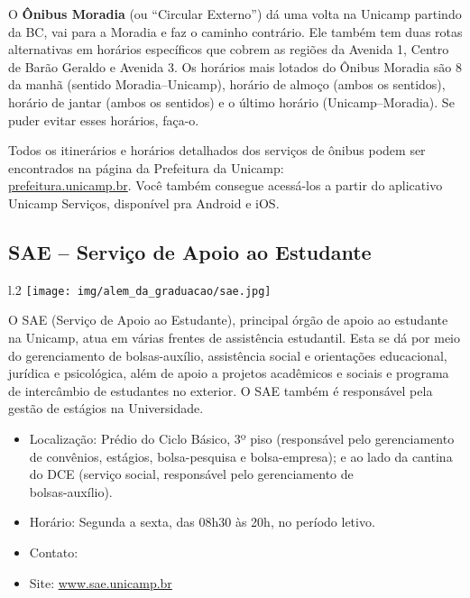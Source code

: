 O \textbf{Ônibus Moradia} (ou ``Circular Externo'') dá uma volta na Unicamp
partindo da BC, vai para a Moradia e faz o caminho contrário. Ele também tem
duas rotas alternativas em horários específicos que cobrem as regiões da Avenida
1, Centro de Barão Geraldo e Avenida 3. Os horários mais lotados do Ônibus
Moradia são 8 da manhã (sentido Moradia--Unicamp), horário de almoço (ambos os
sentidos), horário de jantar (ambos os sentidos) e o último horário
(Unicamp--Moradia). Se puder evitar esses horários, faça-o.

Todos os itinerários e horários detalhados dos serviços de ônibus podem ser
encontrados na página da Prefeitura da Unicamp: \\\url{prefeitura.unicamp.br}.
Você também consegue acessá-los a partir do aplicativo Unicamp Serviços,
disponível pra Android e iOS.

\subsection{SAE -- Serviço de Apoio ao Estudante}
\begin{wrapfigure}{l}{.2\textwidth}
    \centering
    \texttt{[image: img/alem\_da\_graduacao/sae.jpg]}
\end{wrapfigure}
O SAE (Serviço de Apoio ao Estudante), principal órgão de apoio ao estudante na
Unicamp, atua em várias frentes de assistência estudantil. Esta se dá por meio do
gerenciamento de bolsas-auxílio, assistência social e orientações educacional,
jurídica e psicológica, além de apoio a projetos acadêmicos e sociais e programa
de intercâmbio de estudantes no exterior. O SAE também é responsável pela gestão
de estágios na Universidade.

\begin{itemize}
    \item  Localização: Prédio do Ciclo Básico, 3º piso (responsável pelo
        gerenciamento de convênios, estágios, bolsa-pesquisa e bolsa-empresa); e
        ao lado da cantina do DCE (serviço social, responsável pelo gerenciamento 
        de\\ bolsas-auxílio).
    \item  Horário: Segunda a sexta, das 08h30 às 20h, no período letivo.
    \item  Contato: 
    \item  Site: \url{www.sae.unicamp.br}
\end{itemize}

